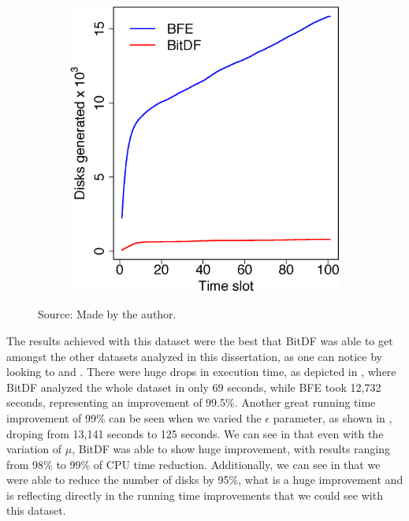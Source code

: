 {\begin{figure}[h!]
\begin{subfigure}[t]{0.48\textwidth}
        \includegraphics[width=\textwidth]{images/Brinkhoff_d.eps}
        \label{fig:brinkhoff_disks}
    \end{subfigure}
    \footnotesize{Source: Made by the author.}
    \label{fig:brinkhoff_results2}
\end{figure}

The results achieved with this dataset were the best that BitDF was able to get amongst the other datasets analyzed in
this dissertation, as one can notice by looking to  and .
There were huge drops in execution time, as depicted in , where BitDF analyzed the whole
dataset in only 69 seconds, while BFE took 12,732 seconds, representing an improvement of 99.5\%. Another great running
time improvement of 99\% can be seen when we varied the $\epsilon$ parameter, as shown in ,
droping from 13,141 seconds to 125 seconds. We can see in  that even with the variation of
$\mu$, BitDF was able to show huge improvement, with results ranging from 98\% to 99\% of CPU time reduction.
Additionally, we can see in  that we were able to reduce the number of disks by 95\%, what
is a huge improvement and is reflecting directly in the running time improvements that we could see with this dataset.

}
